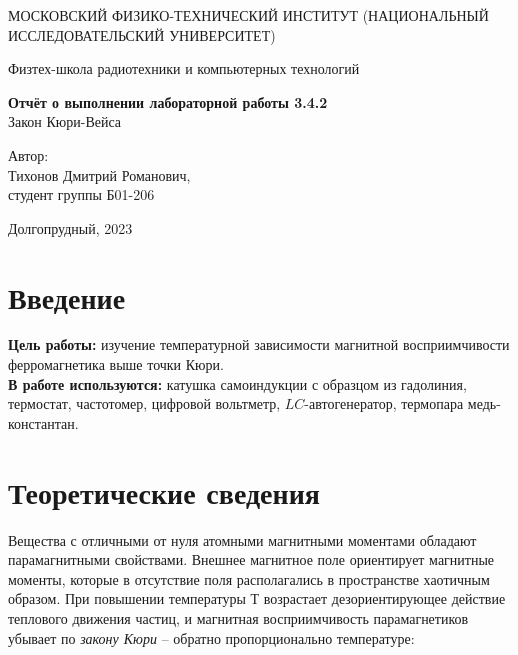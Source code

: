\documentclass[a4paper, 12pt]{article}
\begin{document}
    \begin{titlepage}
	\begin{center}
            {\large МОСКОВСКИЙ ФИЗИКО-ТЕХНИЧЕСКИЙ ИНСТИТУТ (НАЦИОНАЛЬНЫЙ ИССЛЕДОВАТЕЛЬСКИЙ УНИВЕРСИТЕТ)}
	\end{center}
 
	\begin{center}
		{\large Физтех-школа радиотехники и компьютерных технологий}
	\end{center}
	
	\vspace{8cm}
	{\LARGE
		\begin{center}
                {\bf Отчёт о выполнении лабораторной работы 3.4.2}\\
                Закон Кюри-Вейса
		\end{center}
	}
	\vspace{5cm}
	\begin{flushright}
		{\Large Автор:\\ Тихонов Дмитрий Романович, \\
			\vspace{0.2cm}
			студент группы Б01-206}
	\end{flushright}
	\vspace{5cm}
	\begin{center}
		\Large Долгопрудный, 2023
	\end{center}
    \end{titlepage}


    \section{Введение}

    \noindent \textbf{Цель работы:} изучение температурной зависимости магнитной восприимчивости ферромагнетика выше точки Кюри. \\

    \noindent \textbf{В работе используются:} катушка самоиндукции с образцом из гадолиния, термостат, частотомер, цифровой вольтметр, $LC$-автогенератор, термопара медь-константан.
    
    \section{Теоретические сведения}
    
    Вещества с отличными от нуля атомными магнитными моментами обладают парамагнитными свойствами. Внешнее магнитное поле ориентирует магнитные моменты, которые в отсутствие поля располагались в пространстве хаотичным образом. При повышении температуры $Т$ возрастает дезориентирующее действие теплового движения частиц, и магнитная восприимчивость парамагнетиков убывает по \textit{закону Кюри} -- обратно пропорционально температуре:
\end{document}
